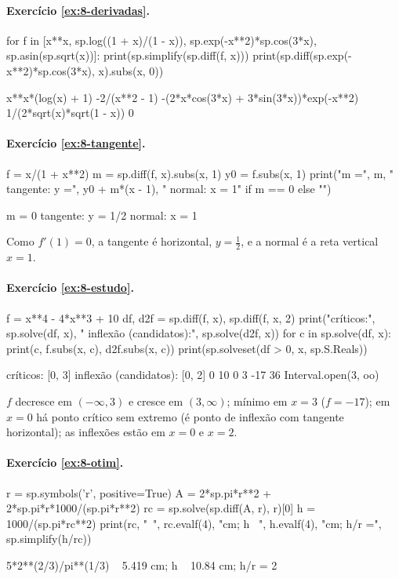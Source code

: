\paragraph{Exercício \ref{ex:8-derivadas}.}
\begin{entrada}
for f in [x**x, sp.log((1 + x)/(1 - x)), sp.exp(-x**2)*sp.cos(3*x), sp.asin(sp.sqrt(x))]:
    print(sp.simplify(sp.diff(f, x)))
print(sp.diff(sp.exp(-x**2)*sp.cos(3*x), x).subs(x, 0))
\end{entrada}
\begin{saida}
x**x*(log(x) + 1)
-2/(x**2 - 1)
-(2*x*cos(3*x) + 3*sin(3*x))*exp(-x**2)
1/(2*sqrt(x)*sqrt(1 - x))
0
\end{saida}

\paragraph{Exercício \ref{ex:8-tangente}.}
\begin{entrada}
f = x/(1 + x**2)
m = sp.diff(f, x).subs(x, 1)
y0 = f.subs(x, 1)
print("m =", m, "  tangente: y =", y0 + m*(x - 1), "  normal: x = 1" if m == 0 else "")
\end{entrada}
\begin{saida}
m = 0   tangente: y = 1/2   normal: x = 1
\end{saida}

Como $f'(1)=0$, a tangente é horizontal, $y=\frac12$, e a normal é a reta vertical $x=1$.

\paragraph{Exercício \ref{ex:8-estudo}.}
\begin{entrada}
f = x**4 - 4*x**3 + 10
df, d2f = sp.diff(f, x), sp.diff(f, x, 2)
print("críticos:", sp.solve(df, x), "  inflexão (candidatos):", sp.solve(d2f, x))
for c in sp.solve(df, x):
    print(c, f.subs(x, c), d2f.subs(x, c))
print(sp.solveset(df > 0, x, sp.S.Reals))
\end{entrada}
\begin{saida}
críticos: [0, 3]   inflexão (candidatos): [0, 2]
0 10 0
3 -17 36
Interval.open(3, oo)
\end{saida}

$f$ decresce em $(-\infty,3)$ e cresce em $(3,\infty)$; mínimo em $x=3$ ($f=-17$); em $x=0$ há ponto crítico sem
extremo (é ponto de inflexão com tangente horizontal); as inflexões estão em $x=0$ e $x=2$.

\paragraph{Exercício \ref{ex:8-otim}.}
\begin{entrada}
r = sp.symbols('r', positive=True)
A = 2*sp.pi*r**2 + 2*sp.pi*r*1000/(sp.pi*r**2)
rc = sp.solve(sp.diff(A, r), r)[0]
h = 1000/(sp.pi*rc**2)
print(rc, "~", rc.evalf(4), "cm;  h ~", h.evalf(4), "cm;  h/r =", sp.simplify(h/rc))
\end{entrada}
\begin{saida}
5*2**(2/3)/pi**(1/3) ~ 5.419 cm;  h ~ 10.84 cm;  h/r = 2
\end{saida}

